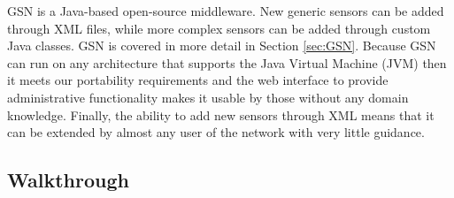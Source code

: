 	GSN is a Java-based open-source middleware. New generic sensors can be added through XML files, while more complex sensors can be added through custom Java classes. GSN is covered in more detail in Section \ref{sec:GSN}. Because GSN can run on any architecture that supports the Java Virtual Machine (JVM) then it meets our portability requirements and the web interface to provide administrative functionality makes it usable by those without any domain knowledge. Finally, the ability to add new sensors through XML means that it can be extended by almost any user of the network with very little guidance.
	
	\subsection{Walkthrough}
	
